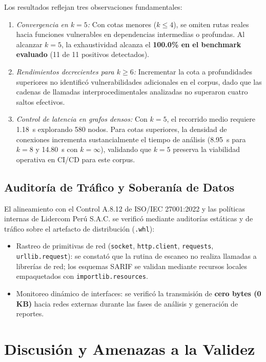 \documentclass[conference]{IEEEtran}
\begin{document}
Los resultados reflejan tres observaciones fundamentales:
\begin{enumerate}
    \item \textit{Convergencia en $k=5$:} Con cotas menores ($k \le 4$), se omiten rutas reales hacia funciones vulnerables en dependencias intermedias o profundas. Al alcanzar $k=5$, la exhaustividad alcanza el \textbf{100.0\% en el benchmark evaluado} (11 de 11 positivos detectados).
    \item \textit{Rendimientos decrecientes para $k \ge 6$:} Incrementar la cota a profundidades superiores no identificó vulnerabilidades adicionales en el corpus, dado que las cadenas de llamadas interprocedimentales analizadas no superaron cuatro saltos efectivos.
    \item \textit{Control de latencia en grafos densos:} Con $k=5$, el recorrido medio requiere 1.18~s explorando 580 nodos. Para cotas superiores, la densidad de conexiones incrementa sustancialmente el tiempo de análisis (8.95~s para $k=8$ y 14.80~s con $k=\infty$), validando que $k=5$ preserva la viabilidad operativa en CI/CD para este corpus.
\end{enumerate}

\subsection{Auditoría de Tráfico y Soberanía de Datos}
El alineamiento con el Control A.8.12 de ISO/IEC 27001:2022 y las políticas internas de Lidercom Perú S.A.C. se verificó mediante auditorías estáticas y de tráfico sobre el artefacto de distribución (\texttt{.whl}):
\begin{itemize}
    \item Rastreo de primitivas de red (\texttt{socket}, \texttt{http.client}, \texttt{requests}, \texttt{urllib.request}): se constató que la rutina de escaneo no realiza llamadas a librerías de red; los esquemas SARIF se validan mediante recursos locales empaquetados con \texttt{importlib.resources}.
    \item Monitoreo dinámico de interfaces: se verificó la transmisión de \textbf{cero bytes (0 KB)} hacia redes externas durante las fases de análisis y generación de reportes.
\end{itemize}

\section{Discusión y Amenazas a la Validez}
\end{document}
